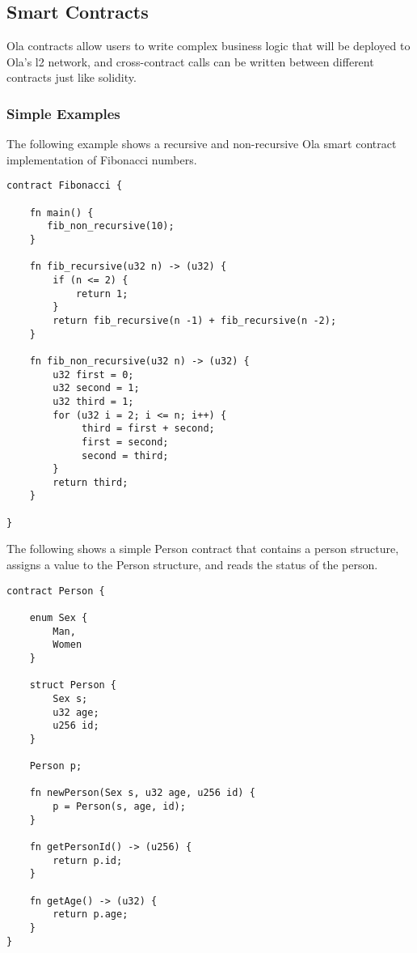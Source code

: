 \subsection{Smart Contracts}


Ola contracts allow users to write complex business logic that will be deployed to Ola's l2 network, and cross-contract calls can be written between different contracts just like solidity.

\subsubsection{Simple Examples}

The following example shows a recursive and non-recursive Ola smart contract implementation of Fibonacci numbers.

\begin{lstlisting}
contract Fibonacci {

    fn main() {
       fib_non_recursive(10);
    }

    fn fib_recursive(u32 n) -> (u32) {
        if (n <= 2) {
            return 1;
        }
        return fib_recursive(n -1) + fib_recursive(n -2);
    }

    fn fib_non_recursive(u32 n) -> (u32) {
        u32 first = 0;
        u32 second = 1;
        u32 third = 1;
        for (u32 i = 2; i <= n; i++) {
             third = first + second;
             first = second;
             second = third;
        }
        return third;
    }

}
\end{lstlisting}

The following shows a simple Person contract that contains a person structure, assigns a value to the Person structure, and reads the status of the person.

\begin{lstlisting}
contract Person {

    enum Sex {
        Man,
        Women
    }

    struct Person {
        Sex s;
        u32 age;
        u256 id;
    }

    Person p;

    fn newPerson(Sex s, u32 age, u256 id) {
        p = Person(s, age, id);
    }

    fn getPersonId() -> (u256) {
        return p.id;
    }

    fn getAge() -> (u32) {
        return p.age;
    }
}
\end{lstlisting}

